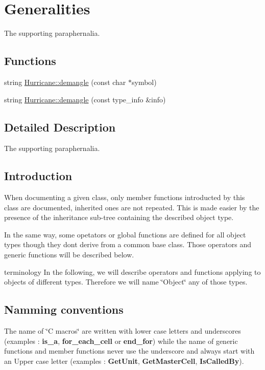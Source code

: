 \hypertarget{group__Generalities}{}\section{Generalities}
\label{group__Generalities}


The supporting paraphernalia.  


\subsection*{Functions}
\begin{DoxyCompactItemize}
\item 
string \hyperlink{group__Generalities_ga93af87d1b7b19294382ba6dae51d0363}{Hurricane\+::demangle} (const char $\ast$symbol)
\item 
string \hyperlink{group__Generalities_gae4be209e8a3f2227b0c7a22246817c6f}{Hurricane\+::demangle} (const type\+\_\+info \&info)
\end{DoxyCompactItemize}


\subsection{Detailed Description}
The supporting paraphernalia. 

\hypertarget{group__Generalities_secGeneralitiesIntro}{}\subsection{Introduction}\label{group__Generalities_secGeneralitiesIntro}
When documenting a given class, only member functions introducted by this class are documented, inherited ones are not repeated. This is made easier by the presence of the inheritance sub-\/tree containing the described object type.

In the same way, some opetators or global functions are defined for all object types though they don\textquotesingle{}t derive from a common base class. Those operators and generic functions will be described below.

terminology In the following, we will describe operators and functions applying to objects of different types. Therefore we will name \char`\"{}\+Object\char`\"{} any of those types.\hypertarget{group__Generalities_secGeneralitiesNammingConventions}{}\subsection{Namming conventions}\label{group__Generalities_secGeneralitiesNammingConventions}
The name of \char`\"{}\+C macros\char`\"{} are written with lower case letters and underscores (examples \+: {\bfseries is\+\_\+a}, {\bfseries for\+\_\+each\+\_\+cell} or {\bfseries end\+\_\+for}) while the name of generic functions and member functions never use the underscore and always start with an Upper case letter (examples \+: {\bfseries Get\+Unit}, {\bfseries Get\+Master\+Cell}, {\bfseries Is\+Called\+By}).

